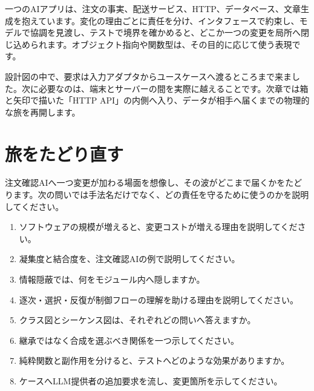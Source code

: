 一つのAIアプリは、注文の事実、配送サービス、HTTP、データベース、文章生成を抱えています。変化の理由ごとに責任を分け、インタフェースで約束し、モデルで協調を見渡し、テストで境界を確かめると、どこか一つの変更を局所へ閉じ込められます。オブジェクト指向や関数型は、その目的に応じて使う表現です。

設計図の中で、要求は入力アダプタからユースケースへ渡るところまで来ました。次に必要なのは、端末とサーバーの間を実際に越えることです。次章では箱と矢印で描いた「HTTP API」の内側へ入り、データが相手へ届くまでの物理的な旅を再開します。



\section{旅をたどり直す}
\label{sec:04-software-engineering-23}

注文確認AIへ一つ変更が加わる場面を想像し、その波がどこまで届くかをたどります。次の問いでは手法名だけでなく、どの責任を守るために使うのかを説明してください。

\begingroup
  \begin{enumerate}
    \item ソフトウェアの規模が増えると、変更コストが増える理由を説明してください。
    \item 凝集度と結合度を、注文確認AIの例で説明してください。
    \item 情報隠蔽では、何をモジュール内へ隠しますか。
    \item 逐次・選択・反復が制御フローの理解を助ける理由を説明してください。
    \item クラス図とシーケンス図は、それぞれどの問いへ答えますか。
    \item 継承ではなく合成を選ぶべき関係を一つ示してください。
    \item 純粋関数と副作用を分けると、テストへどのような効果がありますか。
    \item ケースへLLM提供者の追加要求を流し、変更箇所を示してください。
  \end{enumerate}
\par
\endgroup


